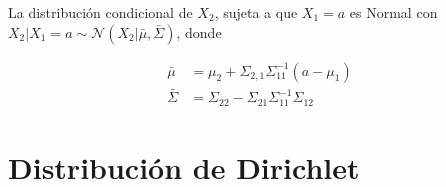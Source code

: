 \begin{prop*}
    La distribuci\'on condicional de $X_2$, sujeta a que $X_1 = a$ es Normal con $X_2|X_1=a \sim \mathcal{N}(X_2|\bar{\mu},\bar{\Sigma})$, donde
    
    \begin{equation*}
    \begin{aligned}
        \bar{\mu} &= \mu_2 + \Sigma_{2,1}\Sigma_{11}^{-1}(a-\mu_1) \\
        \bar{\Sigma} &= \Sigma_{22} - \Sigma_{21}\Sigma_{11}^{-1}\Sigma_{12}
    \end{aligned}
    \end{equation*}
\end{prop*}

\section{Distribuci\'on de Dirichlet}

